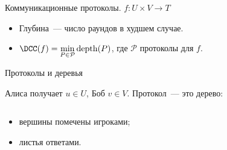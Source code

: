 \begin{frame}{Коммуникационные протоколы. $f\colon U \times V \to T$}
    \begin{center}
    	    
    \end{center}

    \pause
    \pause
    \pause
	\pause

    \begin{itemize}
        \item Глубина~--- число раундов в худшем случае.
        \item $\DCC(f) = \min\limits_{P \in \mathcal{P}} \mathrm{depth}(P)$, где $\mathcal{P}$ протоколы
            для $f$.
    \end{itemize}
\end{frame}

\begin{frame}{Протоколы и деревья}

    Алиса получает $u \in U$, Боб $v \in V$. Протокол~--- это дерево:

    \begin{columns}[t]
		\begin{column}{0.7\textwidth}
            \begin{itemize}
                \item<2-> вершины помечены игроками;
    		    \item<8-> листья ответами.
	        \end{itemize}

        \end{column}
        
		\begin{column}{0.25\textwidth}
            
		\end{column}
	\end{columns}

\end{frame}

